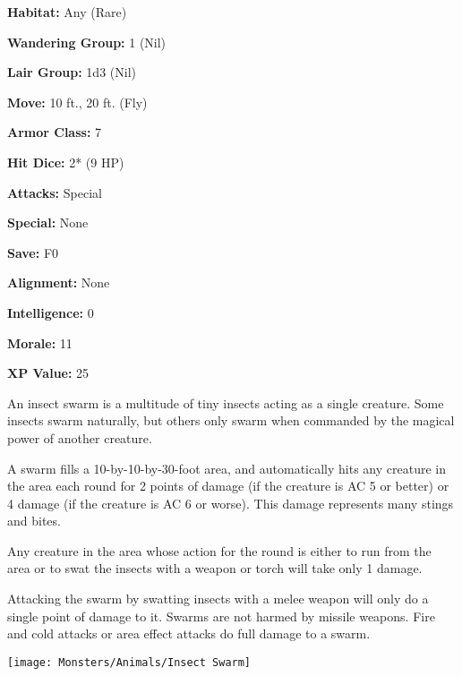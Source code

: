 \begin{multicols*}{2}
{\textbf{Habitat:} Any (Rare)

\textbf{Wandering Group:} 1 (Nil)

\textbf{Lair Group:} 1d3 (Nil)

\textbf{Move:} 10 ft., 20 ft. (Fly)

\textbf{Armor Class:} 7

\textbf{Hit Dice:} 2* (9 HP)

\textbf{Attacks:} Special

\textbf{Special:} None

\textbf{Save:} F0

\textbf{Alignment:} None

\textbf{Intelligence:} 0

\textbf{Morale:} 11

\textbf{XP Value:} 25}

An insect swarm is a multitude of tiny insects acting as a single creature. Some insects swarm naturally, but others only swarm when commanded by the magical power of another creature.

A swarm fills a 10-by-10-by-30-foot area, and automatically hits any creature in the area each round for 2 points of damage (if the creature is AC 5 or better) or 4 damage (if the creature is AC 6 or worse). This damage represents many stings and bites.

Any creature in the area whose action for the round is either to run from the area or to swat the insects with a weapon or torch will take only 1 damage.

Attacking the swarm by swatting insects with a melee weapon will only do a single point of damage to it. Swarms are not harmed by missile weapons. Fire and cold attacks or area effect attacks do full damage to a swarm.

\texttt{[image: Monsters/Animals/Insect Swarm]}


\end{multicols*}
